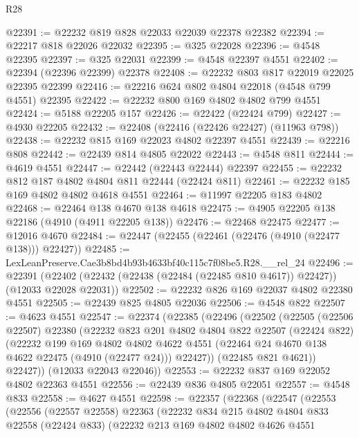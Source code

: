 \begin{lexlean}{R28}
\begin{coremodule}
@22391 := @22232 @819 @828 @22033 @22039 @22378 @22382
@22394 := @22217 @818 @22026 @22032
@22395 := @325 @22028
@22396 := @4548 @22395
@22397 := @325 @22031
@22399 := @4548 @22397 @4551
@22402 := @22394 (@22396 @22399) @22378
@22408 := @22232 @803 @817 @22019 @22025 @22395 @22399
@22416 := @22216 @624 @802 @4804 @22018 (@4548 @799 @4551) @22395
@22422 := @22232 @800 @169 @4802 @4802 @799 @4551
@22424 := @5188 @22205 @157
@22426 := @22422 (@22424 @799)
@22427 := @4930 @22205
@22432 := @22408 (@22416 (@22426 @22427) (@11963 @798))
@22438 := @22232 @815 @169 @22023 @4802 @22397 @4551
@22439 := @22216 @808
@22442 := @22439 @814 @4805 @22022
@22443 := @4548 @811
@22444 := @4619 @4551
@22447 := @22442 (@22443 @22444) @22397
@22455 := @22232 @812 @187 @4802 @4804 @811 @22444 (@22424 @811)
@22461 := @22232 @185 @169 @4802 @4802 @4618 @4551
@22464 := @11997 @22205 @183 @4802
@22468 := @22464 @138 @4670 @138 @4618
@22475 := @4905 @22205 @138 @22186 (@4910 (@4911 @22205 @138))
@22476 := @22468 @22475
@22477 := @12016 @4670
@22484 := @22447 (@22455 (@22461 (@22476 (@4910 (@22477 @138))) @22427))
@22485 := LexLeanPreserve.Cae3b8bd4b93b4633bf40c115c7f08be5.R28.__rel_24
@22496 := @22391
    (@22402 (@22432 (@22438 (@22484 (@22485 @810 @4617)) @22427)) (@12033 @22028 @22031))
@22502 := @22232 @826 @169 @22037 @4802 @22380 @4551
@22505 := @22439 @825 @4805 @22036
@22506 := @4548 @822
@22507 := @4623 @4551
@22547 := @22374
    (@22385
      (@22496
        (@22502
          (@22505
            (@22506 @22507)
            @22380
            (@22232
              @823
              @201
              @4802
              @4804
              @822
              @22507
              (@22424 @822)
              (@22232
                @199
                @169
                @4802
                @4802
                @4622
                @4551
                (@22464 @24 @4670 @138 @4622 @22475 (@4910 (@22477 @24)))
                @22427))
            (@22485 @821 @4621))
          @22427))
      (@12033 @22043 @22046))
@22553 := @22232 @837 @169 @22052 @4802 @22363 @4551
@22556 := @22439 @836 @4805 @22051
@22557 := @4548 @833
@22558 := @4627 @4551
@22598 := @22357
    (@22368
      (@22547
        (@22553
          (@22556
            (@22557 @22558)
            @22363
            (@22232
              @834
              @215
              @4802
              @4804
              @833
              @22558
              (@22424 @833)
              (@22232
                @213
                @169
                @4802
                @4802
                @4626
                @4551

\end{coremodule}
\end{lexlean}
